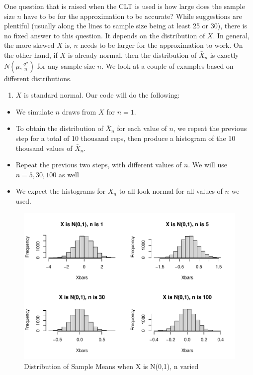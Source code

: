 \documentclass[
]{book}
\providecommand{\tightlist}{%
  \setlength{\itemsep}{0pt}\setlength{\parskip}{0pt}}
\begin{document}
One question that is raised when the CLT is used is how large does the sample size \(n\) have to be for the approximation to be accurate? While suggestions are plentiful (usually along the lines to sample size being at least 25 or 30), there is no fixed answer to this question. It depends on the distribution of \(X\). In general, the more skewed \(X\) is, \(n\) needs to be larger for the approximation to work. On the other hand, if \(X\) is already normal, then the distribution of \(\bar{X}_n\) is exactly \(N(\mu, \frac{\sigma^2}{n})\) for any sample size \(n\). We look at a couple of examples based on different distributions.

\begin{enumerate}
\def\labelenumi{\arabic{enumi}.}
\tightlist
\item
  \(X\) is standard normal. Our code will do the following:
\end{enumerate}

\begin{itemize}
\tightlist
\item
  We simulate \(n\) draws from \(X\) for \(n = 1\).
\item
  To obtain the distribution of \(\bar{X}_n\) for each value of \(n\), we repeat the previous step for a total of 10 thousand reps, then produce a histogram of the 10 thousand values of \(\bar{X}_n\).
\item
  Repeat the previous two steps, with different values of \(n\). We will use \(n= 5, 30, 100\) as well
\item
  We expect the histograms for \(\bar{X}_n\) to all look normal for all values of \(n\) we used.
\end{itemize}

\begin{figure}
\centering
\includegraphics{bookdown-demo_files/figure-latex/6-CLTnorm-1.pdf}
\caption{\label{fig:6-CLTnorm}Distribution of Sample Means when X is N(0,1), n varied}
\end{figure}
\end{document}
